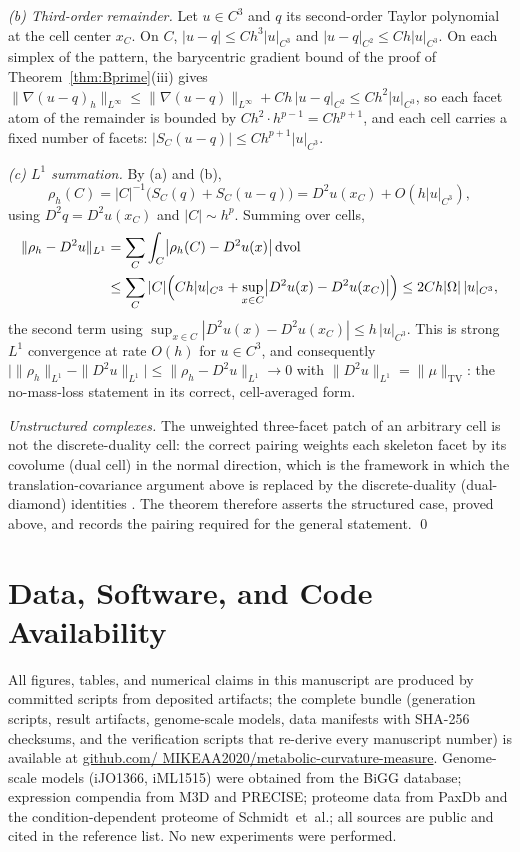 \documentclass[11pt,a4paper]{article}
\theoremstyle{plain}
\theoremstyle{definition}
\theoremstyle{remark}
\newcommand{\TV}{\mathrm{TV}}
\newcommand{\dvol}{\,\mathrm{dvol}}
\begin{document}
\emph{(b) Third-order remainder.} Let $u \in C^{3}$ and $q$ its
second-order Taylor polynomial at the cell center $x_C$. On $C$,
$|u - q| \le Ch^{3}|u|_{C^{3}}$ and $|u - q|_{C^{2}} \le
Ch|u|_{C^{3}}$. On each simplex of the pattern, the barycentric
gradient bound of the proof of Theorem~\ref{thm:Bprime}(iii) gives
$\|\nabla (u - q)_h\|_{L^\infty} \le \|\nabla(u-q)\|_{L^\infty} +
Ch\,|u - q|_{C^{2}} \le Ch^{2}|u|_{C^{3}}$, so each facet atom of
the remainder is bounded by $Ch^{2} \cdot h^{p-1} = Ch^{p+1}$, and
each cell carries a fixed number of facets: $|S_C(u - q)| \le
Ch^{p+1}|u|_{C^{3}}$.

\emph{(c) $L^{1}$ summation.} By (a) and (b),
\[
\rho_h(C) = |C|^{-1}\bigl(S_C(q) + S_C(u-q)\bigr) = D^{2}u(x_C) +
O(h|u|_{C^{3}}),
\]
using $D^{2}q = D^{2}u(x_C)$ and $|C| \sim h^{p}$. Summing over
cells,
\[
\begin{split}
\|\rho_h - D^{2}u\|_{L^{1}}
&= \sum_{C} \int_{C} \bigl|\rho_h(C) - D^{2}u(x)\bigr| \dvol\\
&\le \sum_{C} |C| \Bigl(Ch|u|_{C^{3}} + \sup_{x \in C}
\bigl|D^{2}u(x) - D^{2}u(x_C)\bigr|\Bigr)
\le 2Ch|\Omega|\,|u|_{C^{3}},
\end{split}
\]
the second term using $\sup_{x \in C}|D^{2}u(x) - D^{2}u(x_C)| \le
h\,|u|_{C^{3}}$. This is strong $L^{1}$ convergence at rate $O(h)$
for $u \in C^{3}$, and consequently
$\bigl|\|\rho_h\|_{L^{1}} - \|D^{2}u\|_{L^{1}}\bigr| \le
\|\rho_h - D^{2}u\|_{L^{1}} \to 0$ with $\|D^{2}u\|_{L^{1}} =
\|\mu\|_{\TV}$: the no-mass-loss statement in its correct,
cell-averaged form.

\emph{Unstructured complexes.} The unweighted three-facet patch of an
arbitrary cell is not the discrete-duality cell: the correct pairing
weights each skeleton facet by its covolume (dual cell) in the
normal direction, which is the framework in which the
translation-covariance argument above is replaced by the
discrete-duality (dual-diamond) identities
\citep{cheeger1984}. The theorem therefore asserts the structured
case, proved above, and records the pairing required for the general
statement. \qed

\section*{Data, Software, and Code Availability}
All figures, tables, and numerical claims in this manuscript are
produced by committed scripts from deposited artifacts; the complete
bundle (generation scripts, result artifacts, genome-scale models,
data manifests with SHA-256 checksums, and the verification
scripts that re-derive every manuscript number) is available at
\href{https://github.com/MIKEAA2020/metabolic-curvature-measure}{github.com/
MIKEAA2020/metabolic-curvature-measure}. Genome-scale models
(iJO1366, iML1515) were obtained from the BiGG database; expression
compendia from M3D and PRECISE; proteome data from PaxDb and the
condition-dependent proteome of Schmidt~et~al.; all sources are
public and cited in the reference list. No new experiments were
performed.
\end{document}
